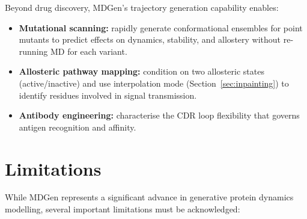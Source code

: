 \documentclass[11pt,a4paper]{article}
\begin{document}
Beyond drug discovery, MDGen's trajectory generation capability enables:
\begin{itemize}[leftmargin=2em]
  \item \textbf{Mutational scanning:} rapidly generate conformational ensembles for point mutants
    to predict effects on dynamics, stability, and allostery without re-running MD for each variant.
  \item \textbf{Allosteric pathway mapping:} condition on two allosteric states (active/inactive)
    and use interpolation mode (Section~\ref{sec:inpainting}) to identify residues involved in
    signal transmission.
  \item \textbf{Antibody engineering:} characterise the CDR loop flexibility that governs antigen
    recognition and affinity.
\end{itemize}


\section{Limitations}
\label{sec:limitations}

While MDGen represents a significant advance in generative protein dynamics modelling, several
important limitations must be acknowledged:
\end{document}
